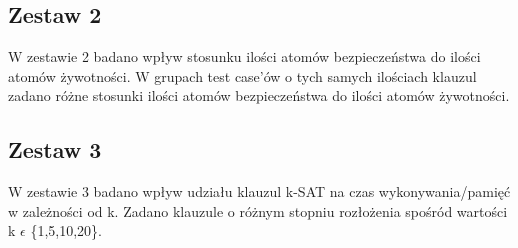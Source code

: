 \documentclass[a4paper,12pt]{article}
\begin{document}
\subsection{Zestaw 2}

W zestawie 2 badano wpływ stosunku ilości atomów bezpieczeństwa do ilości atomów żywotności. W grupach test case'ów o tych samych ilościach klauzul zadano różne stosunki ilości atomów bezpieczeństwa do ilości atomów żywotności. 

\subsection{Zestaw 3}

W zestawie 3 badano wpływ udziału klauzul k-SAT na czas wykonywania/pamięć w zależności od k. Zadano klauzule o różnym stopniu rozłożenia spośród wartości k $\epsilon$ \{1,5,10,20\}. 

\printglossary
\end{document}
